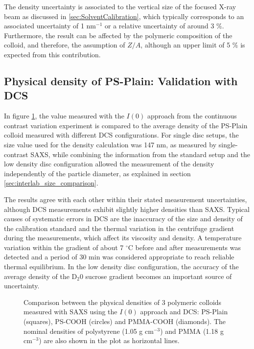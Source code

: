 The density uncertainty is associated to the vertical size of the focused X-ray beam as discussed in \ref{sec:SolventCalibration}, which typically corresponds to an associated uncertainty of 1 nm$^{-1}$ or a relative uncertainty of around 3 $\%$. Furthermore, the result can be affected by the polymeric composition of the colloid, and therefore, the assumption of $Z/A$, although an upper limit of 5 $\%$ is expected from this contribution.

\subsection{Physical density of PS-Plain: Validation with DCS}

In figure \ref{fig:DensityComparison}, the value measured with the $I(0)$ approach from the continuous contrast variation experiment is compared to the average density of the PS-Plain colloid measured with different DCS configurations. For single disc setups, the size value used for the density calculation was 147 nm, as measured by single-contrast SAXS, while combining the information from the standard setup and the low density disc configuration allowed the measurement of the density independently of the particle diameter, as explained in section \ref{sec:interlab_size_comparison}.

The results agree with each other within their stated measurement uncertainties, although DCS measurements exhibit slightly higher densities than SAXS. Typical causes of systematic errors in DCS are the inaccuracy of the size and density of the calibration standard and the thermal variation in the centrifuge gradient during the measurements, which affect its viscosity and density\citep{kamiti_simultaneous_2012}. A temperature variation within the gradient of about 7 $^{\circ}$C before and after measurements was detected and a period of 30 min was considered appropriate to reach reliable thermal equilibrium. In the low density disc configuration, the accuracy of the average density of the D$_2$0 sucrose gradient becomes an important source of uncertainty.
\begin{figure}
	\begin{center}
		
	\end{center}
	\caption{Comparison between the physical densities of 3 polymeric colloids measured with SAXS using the $I(0)$ approach and DCS: PS-Plain (squares), PS-COOH (circles) and PMMA-COOH (diamonds). The nominal densities of polystyrene (1.05 g cm$^{-3}$) and PMMA (1.18 g cm$^{-3}$) are also shown in the plot as horizontal lines\citep{dingenouts_analysis_1999}.}
	\label{fig:DensityComparison}
\end{figure}

